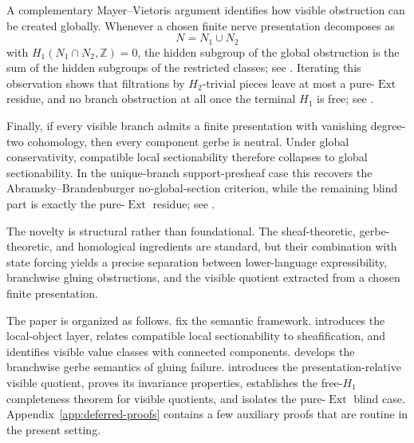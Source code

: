 A complementary Mayer--Vietoris argument identifies how visible obstruction can be created globally. Whenever a chosen finite nerve presentation decomposes as
\[
N=N_1\cup N_2
\]
with $H_1(N_1\cap N_2,\mathbb Z)=0$, the hidden subgroup of the global obstruction is the sum of the hidden subgroups of the restricted classes; see . Iterating this observation shows that filtrations by $H_2$-trivial pieces leave at most a pure-$\operatorname{Ext}$ residue, and no branch obstruction at all once the terminal $H_1$ is free; see .

Finally, if every visible branch admits a finite presentation with vanishing degree-two cohomology, then every component gerbe is neutral. Under global conservativity, compatible local sectionability therefore collapses to global sectionability. In the unique-branch support-presheaf case this recovers the Abramsky--Brandenburger no-global-section criterion, while the remaining blind part is exactly the pure-$\operatorname{Ext}$ residue; see .

The novelty is structural rather than foundational. The sheaf-theoretic, gerbe-theoretic, and homological ingredients are standard, but their combination with state forcing yields a precise separation between lower-language expressibility, branchwise gluing obstructions, and the visible quotient extracted from a chosen finite presentation.

The paper is organized as follows.  fix the semantic framework.  introduces the local-object layer, relates compatible local sectionability to sheafification, and identifies visible value classes with connected components.  develops the branchwise gerbe semantics of gluing failure.  introduces the presentation-relative visible quotient, proves its invariance properties, establishes the free-$H_1$ completeness theorem for visible quotients, and isolates the pure-$\operatorname{Ext}$ blind case. Appendix~\ref{app:deferred-proofs} contains a few auxiliary proofs that are routine in the present setting.
